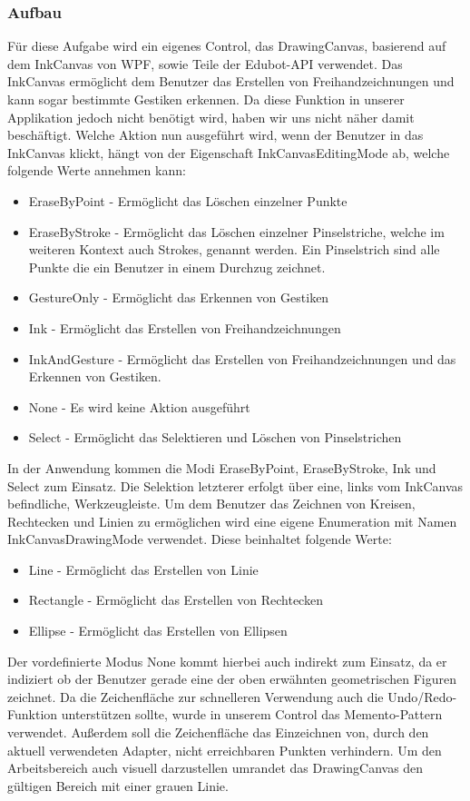 \subsubsection{Aufbau}
Für diese Aufgabe wird ein eigenes Control, das DrawingCanvas, basierend auf dem InkCanvas von WPF, sowie Teile der Edubot-API verwendet. Das InkCanvas ermöglicht dem Benutzer das Erstellen von Freihandzeichnungen und kann sogar bestimmte Gestiken erkennen. Da diese Funktion in unserer Applikation jedoch nicht benötigt wird, haben wir uns nicht näher damit beschäftigt. Welche Aktion nun ausgeführt wird, wenn der Benutzer in das InkCanvas klickt, hängt von der Eigenschaft InkCanvasEditingMode ab, welche folgende Werte annehmen kann:
\begin{itemize}
\item EraseByPoint - Ermöglicht das Löschen einzelner Punkte
\item EraseByStroke - Ermöglicht das Löschen einzelner Pinselstriche, welche im weiteren Kontext auch Strokes, genannt werden. Ein Pinselstrich sind alle Punkte die ein Benutzer in einem Durchzug zeichnet.
\item GestureOnly - Ermöglicht das Erkennen von Gestiken
\item Ink - Ermöglicht das Erstellen von Freihandzeichnungen
\item InkAndGesture - Ermöglicht das Erstellen von Freihandzeichnungen und das Erkennen von Gestiken.
\item None - Es wird keine Aktion ausgeführt
\item Select - Ermöglicht das Selektieren und Löschen von Pinselstrichen
\end{itemize}
In der Anwendung kommen die Modi EraseByPoint, EraseByStroke, Ink und Select zum Einsatz. Die Selektion letzterer erfolgt über eine, links vom InkCanvas befindliche, Werkzeugleiste. Um dem Benutzer das Zeichnen von Kreisen, Rechtecken und Linien zu ermöglichen wird eine eigene Enumeration mit Namen InkCanvasDrawingMode verwendet. Diese beinhaltet folgende Werte:
\begin{itemize}
\item Line - Ermöglicht das Erstellen von Linie
\item Rectangle - Ermöglicht das Erstellen von Rechtecken
\item Ellipse - Ermöglicht das Erstellen von Ellipsen
\end{itemize}
Der vordefinierte Modus None kommt hierbei auch indirekt zum Einsatz, da er indiziert ob der Benutzer gerade eine der oben erwähnten geometrischen Figuren zeichnet. 
Da die Zeichenfläche zur schnelleren Verwendung auch die Undo/Redo-Funktion unterstützen sollte, wurde in unserem Control das Memento-Pattern verwendet. Außerdem soll die Zeichenfläche das Einzeichnen von, durch den aktuell verwendeten Adapter, nicht erreichbaren Punkten verhindern. Um den Arbeitsbereich auch visuell darzustellen umrandet das DrawingCanvas den gültigen Bereich mit einer grauen Linie.

